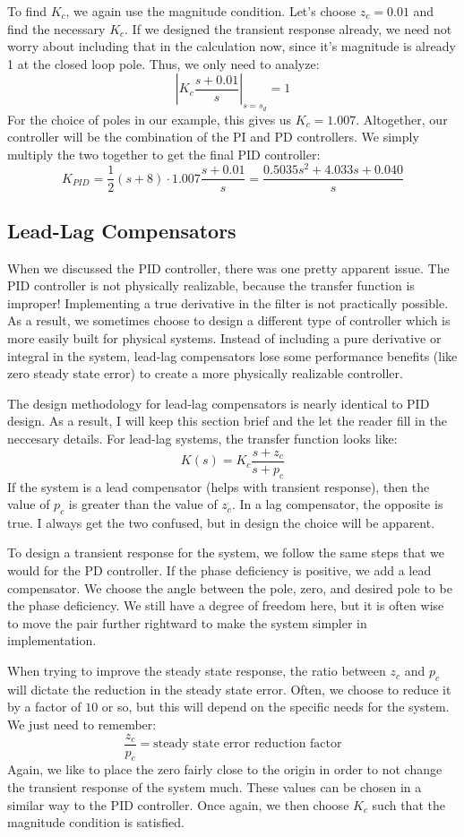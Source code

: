 To find $K_c$, we again use the magnitude condition. Let's choose $z_c=0.01$ and find the necessary $K_c$. If we designed the transient response already, we need not worry about including that in the calculation now, since it's magnitude is already 1 at the closed loop pole. Thus, we only need to analyze:
$$\left|K_c\frac{s+0.01}{s}\right|_{s=s_d}=1$$
For the choice of poles in our example, this gives us $K_c=1.007$. Altogether, our controller will be the combination of the PI and PD controllers. We simply multiply the two together to get the final PID controller:
$$K_{PID}=\frac{1}{2}(s+8)\cdot1.007\frac{s+0.01}{s}=\frac{0.5035s^2+4.033s+0.040}{s}$$

\subsection{Lead-Lag Compensators}
When we discussed the PID controller, there was one pretty apparent issue. The PID controller is not physically realizable, because the transfer function is improper! Implementing a true derivative in the filter is not practically possible. As a result, we sometimes choose to design a different type of controller which is more easily built for physical systems. Instead of including a pure derivative or integral in the system, lead-lag compensators lose some performance benefits (like zero steady state error) to create a more physically realizable controller.

The design methodology for lead-lag compensators is nearly identical to PID design. As a result, I will keep this section brief and the let the reader fill in the neccesary details. For lead-lag systems, the transfer function looks like:
$$K(s)=K_c\frac{s+z_c}{s+p_c}$$
If the system is a lead compensator (helps with transient response), then the value of $p_c$ is greater than the value of $z_c$. In a lag compensator, the opposite is true. I always get the two confused, but in design the choice will be apparent.

To design a transient response for the system, we follow the same steps that we would for the PD controller. If the phase deficiency is positive, we add a lead compensator. We choose the angle between the pole, zero, and desired pole to be the phase deficiency. We still have a degree of freedom here, but it is often wise to move the pair further rightward to make the system simpler in implementation. 


When trying to improve the steady state response, the ratio between $z_c$ and $p_c$ will dictate the reduction in the steady state error. Often, we choose to reduce it by a factor of $10$ or so, but this will depend on the specific needs for the system. We just need to remember:
$$\frac{z_c}{p_c}=\text{steady state error reduction factor}$$
Again, we like to place the zero fairly close to the origin in order to not change the transient response of the system much. These values can be chosen in a similar way to the PID controller. Once again, we then choose $K_c$ such that the magnitude condition is satisfied.

